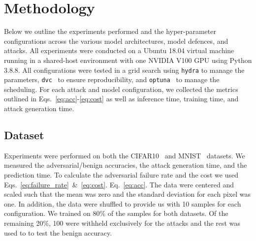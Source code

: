 \section{Methodology}
\label{methods}
Below we outline the experiments performed and the hyper-parameter configurations across the various model architectures, model defences, and attacks. All experiments were conducted on a Ubuntu 18.04 virtual machine running in a shared-host environment with one NVIDIA V100 GPU using Python 3.8.8. All configurations were tested in a grid search using \texttt{hydra} \citep{hydra} to manage the parameters, \texttt{dvc}~\citep{dvc} to ensure reproducibility, and \texttt{optuna}~\citep{optuna} to manage the scheduling. For each attack and model configuration, we collected the metrics outlined in Eqs.~\ref{eq:acc}-\ref{eq:cost} as well as inference time, training time, and attack generation time.

\subsection{Dataset}
\label{dataset}
Experiments were performed on both the CIFAR10~\citep{cifar} and MNIST~\citep{mnist} datasets. We measured the adversarial/benign accuracies, the attack generation time, and the prediction time. To calculate the adversarial failure rate and the cost we used Eqs.~\ref{eq:failure_rate}~\&~\ref{eq:cost}. Eq.~\ref{eq:acc}. The data were centered and scaled such that the mean was zero and the standard deviation for each pixel was one. In addition, the data were shuffled to provide us with 10 samples for each configuration. We trained on 80\% of the samples for both datasets. Of the remaining 20\%, 100 were withheld exclusively for the attacks and the rest was used to to test the benign accuracy.

